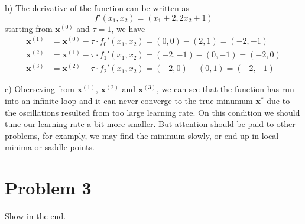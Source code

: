 \documentclass{article}
\begin{document}
b) The derivative of the function can be written as
\begin{equation}
	f'(x_1,x_2) = (x_1+2, 2x_2+1)
\end{equation}
starting from $\bm{x}^{(0)}$ and $\tau=1$, we have
\begin{equation}
	\begin{aligned}
		\bm{x}^{(1)} &= \bm{x}^{(0)} - \tau \cdot f_0'(x_1,x_2) = (0,0)-(2,1) = (-2, -1)\\
		\bm{x}^{(2)} &= \bm{x}^{(1)} - \tau \cdot f_1'(x_1,x_2) = (-2,-1)-(0,-1) = (-2, 0)\\
		\bm{x}^{(3)} &= \bm{x}^{(2)} - \tau \cdot f_2'(x_1,x_2) = (-2,0)-(0,1) = (-2, -1)	
	\end{aligned}
\end{equation}

c) Oberseving from $\bm{x}^{(1)}$, $\bm{x}^{(2)}$ and $\bm{x}^{(3)}$, we can see that the function has run into an infinite loop and it can never converge to the true minumum $\bm{x}^*$ due to the oscillations resulted from too large learning rate. On this condition we should tune our learning rate a bit more smaller. But attention should be paid to other problems, for examply, we may find the minimum slowly, or end up in local minima or saddle points.

\section*{Problem 3}
Show in the end.
\end{document}
